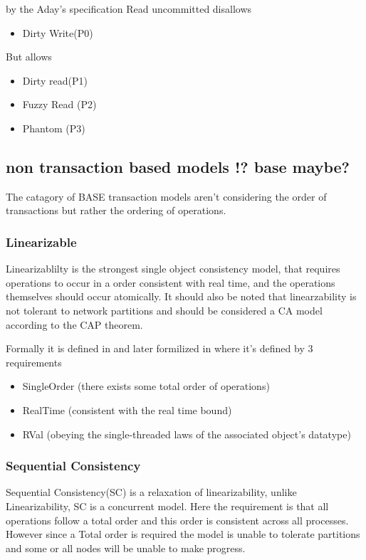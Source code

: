 \documentclass[a4paper,10pt,titlepage]{report}
\begin{document}
    by the Aday's specification Read uncommitted disallows
    \begin{itemize}
        \item Dirty Write(P0)
    \end{itemize}
    But allows
    \begin{itemize}
        \item Dirty read(P1)
        \item Fuzzy Read (P2)
        \item Phantom (P3)
    \end{itemize}

    \subsection{non transaction based models !? base maybe?}
    The catagory of BASE transaction models aren't considering the order of transactions but rather the ordering of operations.

    \subsubsection{Linearizable}
    Linearizablilty is the strongest single object consistency model, that requires operations to occur in a order consistent with real time, and the operations themselves should occur atomically. It should also be noted that linearzability is not tolerant to network partitions and should be considered a CA model according to the CAP theorem.

    Formally it is defined in \cite{Linearizability} and later formilized in \cite{ConsistencyinNonTransactionalDistributedStorageSystems} where it's defined by 3 requirements


    \begin{itemize}
    \item SingleOrder (there exists some total order of operations)
    \item RealTime (consistent with the real time bound)
    \item RVal (obeying the single-threaded laws of the associated object's datatype)
\end{itemize} 


    \subsubsection{Sequential Consistency}
    Sequential Consistency(SC) is a relaxation of linearizability, unlike Linearizability, SC is a concurrent model. Here the requirement is that all operations follow a total order and this order is consistent across all processes. However since a Total order is required the model is unable to tolerate partitions and some or all nodes will be unable to make progress. \\
\end{document}
